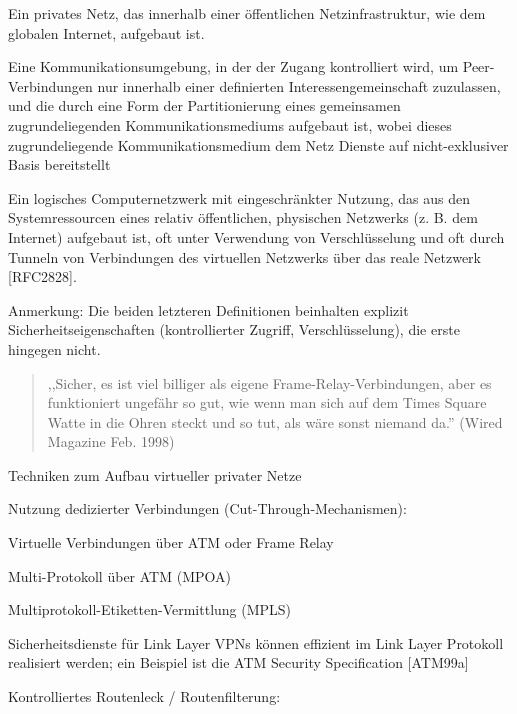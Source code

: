 \documentclass[a4paper]{article}
\begin{document}
\begin{multicols}{3}
\begin{itemize*}
            \begin{itemize*}
                  \item Ein privates Netz, das innerhalb einer öffentlichen Netzinfrastruktur, wie dem globalen Internet, aufgebaut ist.
                  \item Eine Kommunikationsumgebung, in der der Zugang kontrolliert wird, um Peer-Verbindungen nur innerhalb einer definierten Interessengemeinschaft zuzulassen, und die durch eine Form der Partitionierung eines gemeinsamen zugrundeliegenden Kommunikationsmediums aufgebaut ist, wobei dieses zugrundeliegende Kommunikationsmedium dem Netz Dienste auf nicht-exklusiver Basis bereitstellt
                  \item Ein logisches Computernetzwerk mit eingeschränkter Nutzung, das aus den Systemressourcen eines relativ öffentlichen, physischen Netzwerks (z. B. dem Internet) aufgebaut ist, oft unter Verwendung von Verschlüsselung und oft durch Tunneln von Verbindungen des virtuellen Netzwerks über das reale Netzwerk {[}RFC2828{]}.
                  \item Anmerkung: Die beiden letzteren Definitionen beinhalten explizit Sicherheitseigenschaften (kontrollierter Zugriff, Verschlüsselung), die erste hingegen nicht.
            \end{itemize*}
      \end{itemize*}

      \begin{quote}
            ,,Sicher, es ist viel billiger als eigene Frame-Relay-Verbindungen, aber
            es funktioniert ungefähr so gut, wie wenn man sich auf dem Times Square
            Watte in die Ohren steckt und so tut, als wäre sonst niemand da.''
            (Wired Magazine Feb. 1998)
      \end{quote}

      Techniken zum Aufbau virtueller privater Netze

      \begin{itemize*}
            \item
            Nutzung dedizierter Verbindungen (Cut-Through-Mechanismen):

            \begin{itemize*}
                  \item Virtuelle Verbindungen über ATM oder Frame Relay
                  \item Multi-Protokoll über ATM (MPOA)
                  \item Multiprotokoll-Etiketten-Vermittlung (MPLS)
                  \item Sicherheitsdienste für Link Layer VPNs können effizient im Link Layer Protokoll realisiert werden; ein Beispiel ist die ATM Security Specification {[}ATM99a{]}
            \end{itemize*}
            \item
            Kontrolliertes Routenleck / Routenfilterung:


\end{itemize*}
\end{multicols}
\end{document}
